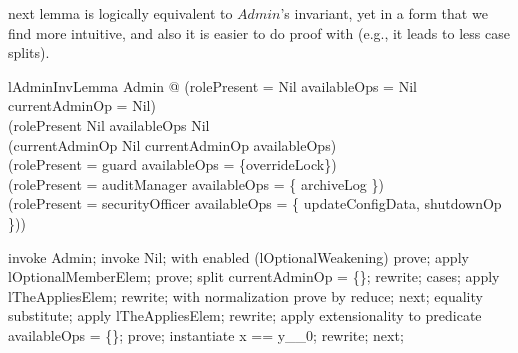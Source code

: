 \The next lemma is logically equivalent to $Admin$'s invariant, yet in a form
that we find more intuitive, and also it is easier to do proof with (e.g., it leads
to less case splits).
%
\begin{theorem}{lAdminInvLemma}
   \forall Admin @
(rolePresent = Nil \land availableOps = Nil \land currentAdminOp = Nil) \\
\lor
(rolePresent \neq Nil \land availableOps \neq Nil \land \\
    (currentAdminOp \neq Nil \implies \The currentAdminOp \in availableOps) \land\\
    (\The rolePresent = guard \implies availableOps = \{overrideLock\}) \land\\
    (\The rolePresent = auditManager \implies availableOps = \{ archiveLog \}) \land\\
    (\The rolePresent = securityOfficer \implies availableOps = \{ updateConfigData, shutdownOp \}))
\end{theorem}

\begin{zproof}[lAdminInvLemma]
invoke Admin;
invoke Nil;
with enabled (lOptionalWeakening) prove;
apply lOptionalMemberElem;
prove;
split currentAdminOp = \{\};
rewrite;
cases;
apply lTheAppliesElem;
rewrite;
with normalization prove by reduce;
next;
equality substitute;
apply lTheAppliesElem;
rewrite;
apply extensionality to predicate availableOps = \{\};
prove;
instantiate x == y\_\_0;
rewrite;
next;
\end{zproof}

